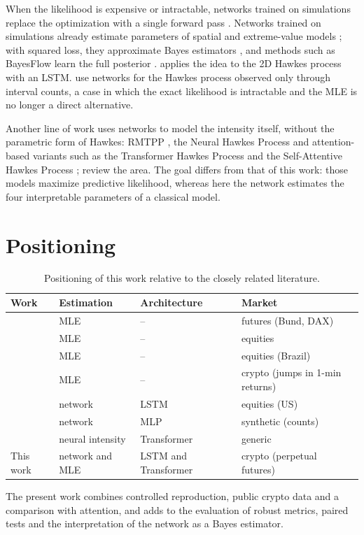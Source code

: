 When the likelihood is expensive or intractable, networks trained on simulations
replace the optimization with a single forward pass \citep{cranmer2020}. Networks
trained on simulations already estimate parameters of spatial and extreme-value
models \citep{gerber2021,lenzi2023}; with squared loss, they approximate Bayes
estimators \citep{sainsburydale2024}, and methods such as BayesFlow learn the full
posterior \citep{radev2022}. \citet{lee2023} applies the idea to the 2D Hawkes process
with an LSTM. \citet{lambe2025} use networks for the Hawkes process observed only
through interval counts, a case in which the exact likelihood is intractable and the
MLE is no longer a direct alternative.

Another line of work uses networks to model the intensity itself, without the
parametric form of Hawkes: RMTPP \citep{du2016}, the Neural Hawkes Process
\citep{mei2017} and attention-based variants such as the Transformer Hawkes Process
\citep{zuo2020} and the Self-Attentive Hawkes Process \citep{zhang2020};
\citet{shchur2021} review the area. The goal differs from that of this work: those
models maximize predictive likelihood, whereas here the network estimates the four
interpretable parameters of a classical model.

\section{Positioning}

\begin{table}[htbp]
\centering
\caption{Positioning of this work relative to the closely related literature.}
\label{tab:posicionamento}
\small
\begin{tabularx}{\linewidth}{lllX}
\toprule
Work & Estimation & Architecture & Market\\
\midrule
\citet{bacry2013} & MLE & -- & futures (Bund, DAX)\\
\citet{leeseo2017} & MLE & -- & equities\\
\citet{primo2018} & MLE & -- & equities (Brazil)\\
\citet{taddeo2024} & MLE & -- & crypto (jumps in 1-min returns)\\
\citet{lee2023} & network & LSTM & equities (US)\\
\citet{lambe2025} & network & MLP & synthetic (counts)\\
\citet{zuo2020} & neural intensity & Transformer & generic\\
This work & network and MLE & LSTM and Transformer & crypto (perpetual futures)\\
\bottomrule
\end{tabularx}
\end{table}

The present work combines controlled reproduction, public crypto data and a
comparison with attention, and adds to the evaluation of \citet{lee2023} robust
metrics, paired tests and the interpretation of the network as a Bayes estimator.
